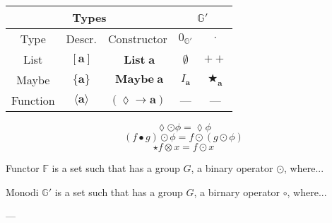 \documentclass{jsarticle}
\newcommand{\htypename}[1]{\mathbf{#1}}
\newcommand{\htypeclassname}[1]{\mathbb{#1}}
\begin{document}
\begin{center}
\begin{tabular}{||c|c|c||c|c||}
\hline
\multicolumn{3}{||c||}{Types}
    &\multicolumn{2}{|c||}{$\htypeclassname{G}'$}\\
\hline
Type
    &Descr.
    &Constructor
    &$0_\htypeclassname{G'}$
    &$\cdot$\\
\hline\hline
List
    &$[\htypename{a}]$
    &$\mathop{\htypename{List}}\htypename{a}$
    &$\emptyset$
    &$++$\\
\hline
Maybe
    &$\{\htypename{a}\}$
    &$\mathop{\htypename{Maybe}}\htypename{a}$
    &$I_\htypename{a}$
    &$\bigstar_\htypename{a}$\\
\hline
Function
    &$\langle\htypename{a}\rangle$
    &$(\lozenge\longrightarrow\htypename{a})$
    &---
    &---\\
\hline
\end{tabular}
\end{center}


$$\lozenge\odot\phi=\lozenge\phi$$
$$(f\bullet g)\odot\phi=f\odot(g\odot\phi)$$
$$\star f\otimes x=f\odot x$$


Functor $\htypeclassname{F}$ is a set such that has a group $G$, a binary operator $\odot$, where...

Monodi $\htypeclassname{G}'$ is a set such that has a group $G$, a birnary operator $\circ$, where...

---
\end{document}

